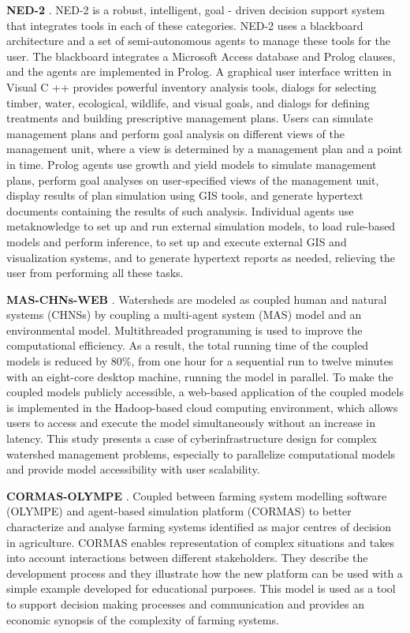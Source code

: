 \documentclass[letterpaper, 10 pt, conference]{ieeeconf}  %
\begin{document}
\textbf{NED-2} \cite{Nute2004}. NED-2 is a robust, intelligent, goal - driven decision support system that integrates tools in each of these categories. NED-2 uses a blackboard architecture and a set of semi-autonomous agents to manage these tools for the user. The blackboard integrates a Microsoft Access database and Prolog clauses, and the agents are implemented in Prolog. A graphical user interface written in Visual C ++ provides powerful inventory analysis tools, dialogs for selecting timber, water, ecological, wildlife, and visual goals, and dialogs for defining treatments and building prescriptive management plans. Users can simulate management plans and perform goal analysis on different views of the management unit, where a view is determined by a management plan and a point in time. Prolog agents use growth and yield models to simulate management plans, perform goal analyses on user-specified views of the management unit, display results of plan simulation using GIS tools, and generate hypertext documents containing the results of such analysis. Individual agents use metaknowledge to set up and run external simulation models, to load rule-based models and perform inference, to set up and execute external GIS and visualization systems, and to generate hypertext reports as needed, relieving the user from performing all these tasks.

\textbf{MAS-CHNs-WEB} \cite{hu2015design}. Watersheds are modeled as coupled human and natural systems (CHNSs) by coupling a multi-agent system (MAS) model and an environmental model. Multithreaded programming is used to improve the computational efficiency. As a result, the total running time of the coupled models is reduced by 80\%, from one hour for a sequential run to twelve minutes with an eight-core desktop machine, running the model in parallel. To make the coupled models publicly accessible, a web-based application of the coupled models is implemented in the Hadoop-based cloud computing environment, which allows users to access and execute the model simultaneously without an increase in latency. This study presents a case of cyberinfrastructure design for complex watershed management problems, especially to parallelize computational models and provide model accessibility with user scalability. 

\textbf{CORMAS-OLYMPE} \cite{bonte2005coupling}. Coupled between farming  system modelling  software  (OLYMPE) and agent-based simulation platform (CORMAS) to better  characterize  and  analyse  farming  systems identified  as  major  centres  of  decision  in  agriculture. CORMAS enables representation of  complex  situations  and  takes  into  account interactions  between  different  stakeholders.  They describe the development process and they illustrate how the new platform can  be  used  with  a  simple  example  developed  for educational  purposes. This model is used as a tool to support decision making
processes  and  communication  and provides an economic  synopsis of  the  complexity of  farming systems.
\end{document}
